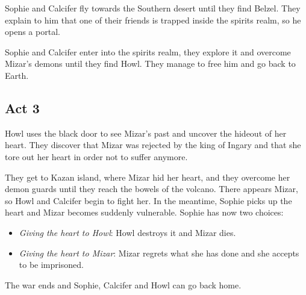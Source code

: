 Sophie and Calcifer fly towards the Southern desert until they find Belzel. They explain to him that one of their friends is trapped inside the spirits realm, so he opens a portal.

Sophie and Calcifer enter into the spirits realm, they explore it and overcome Mizar's demons until they find Howl. They manage to free him and go back to Earth.

\subsection*{Act 3}
Howl uses the black door to see Mizar's past and uncover the hideout of her heart. They discover that Mizar was rejected by the king of Ingary and that she tore out her heart in order not to suffer anymore.

They get to Kazan island, where Mizar hid her heart, and they overcome her demon guards until they reach the bowels of the volcano. There appears Mizar, so Howl and Calcifer begin to fight her. In the meantime, Sophie picks up the heart and Mizar becomes suddenly vulnerable. Sophie has now two choices:
\begin{itemize}
\item \textit{Giving the heart to Howl}: Howl destroys it and Mizar dies.
\item \textit{Giving the heart to Mizar}: Mizar regrets what she has done and she accepts to be imprisoned.
\end{itemize} 

The war ends and Sophie, Calcifer and Howl can go back home.